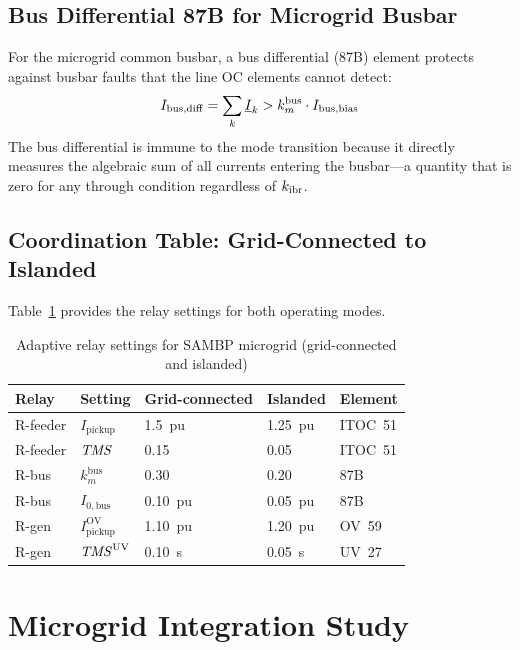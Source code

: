 \subsection{Bus Differential 87B for Microgrid Busbar}

For the microgrid common busbar, a bus differential (87B) element protects
against busbar faults that the line OC elements cannot detect:
\begin{equation}
  I_\mathrm{bus,diff} = \sum_{k} \underline{I}_k > k_m^\mathrm{bus} \cdot I_\mathrm{bus,bias}
  \label{eq:ch6_87b}
\end{equation}
The bus differential is immune to the mode transition because it directly
measures the algebraic sum of all currents entering the busbar—a quantity
that is zero for any through condition regardless of $k_\mathrm{ibr}$.

\subsection{Coordination Table: Grid-Connected to Islanded}

Table~\ref{tab:ch6_settings} provides the relay settings for both
operating modes.

\begin{table}[htbp]
\caption{Adaptive relay settings for SAMBP microgrid (grid-connected and islanded)}
\label{tab:ch6_settings}
\begin{tabularx}{\textwidth}{@{}lXXXl@{}}
\toprule
Relay & Setting & Grid-connected & Islanded & Element \\
\midrule
R-feeder & $I_\mathrm{pickup}$ & 1.5~pu & 1.25~pu & ITOC~51 \\
R-feeder & $\mathit{TMS}$ & 0.15 & 0.05 & ITOC~51 \\
R-bus & $k_m^\mathrm{bus}$ & 0.30 & 0.20 & 87B \\
R-bus & $I_{0,\mathrm{bus}}$ & 0.10~pu & 0.05~pu & 87B \\
R-gen & $I_\mathrm{pickup}^\mathrm{OV}$ & 1.10~pu & 1.20~pu & OV~59 \\
R-gen & $\mathit{TMS}^\mathrm{UV}$ & 0.10~s & 0.05~s & UV~27 \\
\bottomrule
\end{tabularx}
\end{table}

\section{Microgrid Integration Study}
\label{sec:ch5_integration}

